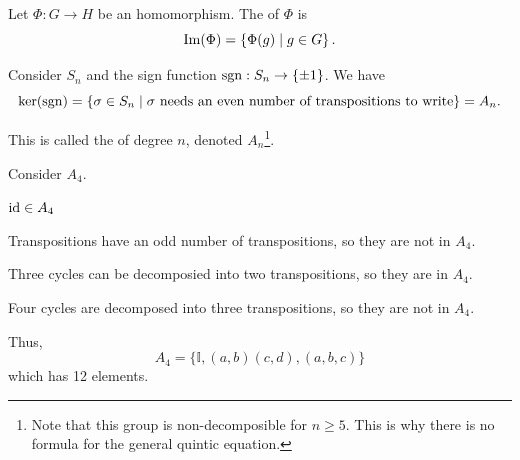 


        

\begin{definition}
    Let $\Phi: G \to H$ be an homomorphism. The  of $\Phi$ is \[
        \mathrm{Im}(\Phi) = \left\{ \Phi(g) \mid g \in G \right\}.
    \]
\end{definition}


\begin{example}
    Consider $S_n$ and the sign function $\mathrm{sgn}: S_n \to \{\pm 1\}$. We have \[
        \ker(\mathrm{sgn}) = \left\{ \sigma \in S_n \mid \sigma \text{ needs an even number of transpositions to write} \right\} = A_n.
    \]

    This is called the  of degree $n$, denoted $A_n$\footnote{Note that this group is non-decomposible for $n \geq 5$. This is why there is no formula for the general quintic equation.}.
\end{example}

\begin{example}
    Consider $A_4$. 

    \begin{listu}
        \item $\mathrm{id} \in A_4$
        \item Transpositions have an odd number of transpositions, so they are not in $A_4$.
        \item Three cycles can be decomposied into two transpositions, so they are in $A_4$.
        \item Four cycles are decomposed into three transpositions, so they are not in $A_4$.
    \end{listu}

    Thus, \[
        A_4 = \{ \mathbb{I}, (a, b)(c, d), (a, b, c) \}
    \] which has 12 elements. 
\end{example}

